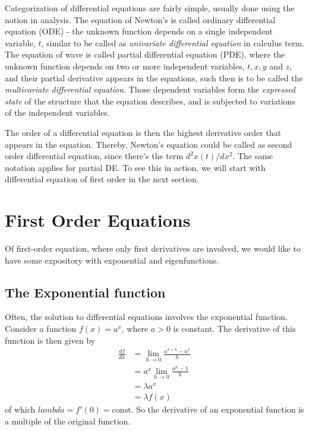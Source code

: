 Categorization of differential equations are fairly simple, usually done using the notion in analysis. The equation of Newton's is called ordinary differential equation (ODE) - the unknown function depends on a single independent variable, $t$, similar to be called as \textit{univariate differential equation} in calculus term. The equation of wave is called partial differential equation (PDE), where the unknown function depends on two or more independent variables, $t,x,y$ and $z$, and their partial derivative appears in the equations, such then is to be called the \textit{multivariate differential equation}. Those dependent variables form the \textit{expressed state} of the structure that the equation describes, and is subjected to variations of the independent variables. 

The order of a differential equation is then the highest derivative order that appears in the equation. Thereby, Newton's equation could be called as second order differential equation, since there's the term $d^2x(t)/dx^2$. The same notation applies for partial DE. To see this in action, we will start with differential equation of first order in the next section. 
\section{First Order Equations}

Of first-order equation, where only first derivatives are involved, we would like to have some expository with exponential and eigenfunctions. 

\subsection{The Exponential function}
Often, the solution to differential equations involves the exponential function. Consider a function $f(x)=a^{x}$, where $a>0$ is constant. The derivative of this function is then given by 
\begin{equation*}
    \begin{split}
        \frac{df}{dx} & = \lim_{h\to 0} \frac{a^{x+h}-a^{x}}{h}\\
        & = a^{x} \lim_{h\to 0} \frac{a^{h}-1}{h}\\
        & = \lambda a^{x}\\
        & = \lambda f(x)
    \end{split}
\end{equation*}
of which $lambda=f'(0)=\mathrm{const}$. So the derivative of an exponential function is a multiple of the original function. 

